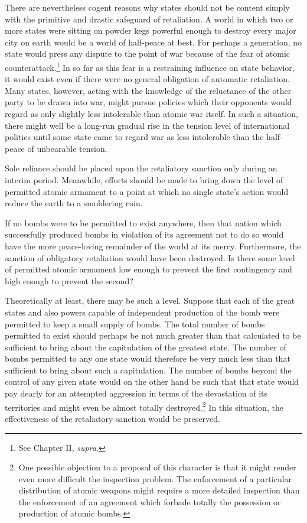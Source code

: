 There are nevertheless cogent reasons why states should not be content simply with the primitive and drastic safeguard of retaliation. A world in which two or more states were sitting on powder kegs powerful enough to destroy every major city on earth would be a world of half-peace at best. For perhaps a generation, no state would press any dispute to the point of war because of the fear of atomic counterattack.\footnote{See Chapter II, \textit{supra}.} In so far as this fear is a restraining influence on state behavior, it would exist even if there were no general obligation of automatic retaliation. Many states, however, acting with the knowledge of the reluctance of the other party to be drawn into war, might pursue policies which their opponents would regard as only slightly less intolerable than atomic war itself. In such a situation, there might well be a long-run gradual rise in the tension level of international politics until some state came to regard war as less intolerable than the half-peace of unbearable tension.

Sole reliance should be placed upon the retaliatory sanction only during an interim period. Meanwhile, efforts should be made to bring down the level of permitted atomic armament to a point at which no single state's action would reduce the earth to a smoldering ruin.

If no bombs were to be permitted to exist anywhere, then that nation which successfully produced bombs in violation of its agreement not to do so would have the more peace-loving remainder of the world at its mercy. Furthermore, the sanction of obligatory retaliation would have been destroyed. Is there some level of permitted atomic armament low enough to prevent the first contingency and high enough to prevent the second?

Theoretically at least, there may be such a level. Suppose that each of the great states and also powers capable of independent production of the bomb were permitted to keep a small supply of bombs. The total number of bombs permitted to exist should perhaps be not much greater than that calculated to be sufficient to bring about the capitulation of the greatest state. The number of bombs permitted to any one state would therefore be very much less than that sufficient to bring about such a capitulation. The number of bombs beyond the control of any given state would on the other hand be such that that state would pay dearly for an attempted aggression in terms of the devastation of its territories and might even be almost totally destroyed.\footnote{One possible objection to a proposal of this character is that it might render even more difficult the inspection problem. The enforcement of a particular distribution of atomic weapons might require a more detailed inspection than the enforcement of an agreement which forbade totally the possession or production of atomic bombs.} In this situation, the effectiveness of the retaliatory sanction would be preserved.

